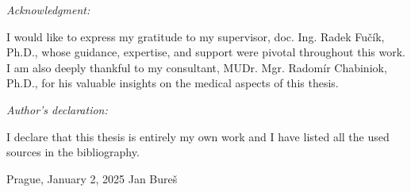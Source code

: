 \newpage
\noindent \vspace*{0pt} %
\emph{\Large{}Acknowledgment:}{\Large\par}

\noindent I would like to express my gratitude to my supervisor, doc. Ing. Radek Fučík, Ph.D., whose guidance, expertise, and support were pivotal throughout this work. I am also deeply thankful to my consultant, MUDr. Mgr. Radomír Chabiniok, Ph.D., for his valuable insights on the medical aspects of this thesis.

\vspace*{\fill} %

\noindent \emph{\Large{}Author’s declaration:}{\Large\par}

\noindent I declare that this thesis is entirely my own work and I have listed all the used sources in the bibliography.

\bigskip{}

\noindent Prague, January 2, 2025 \hfill{}Jan Bureš

\newpage{}